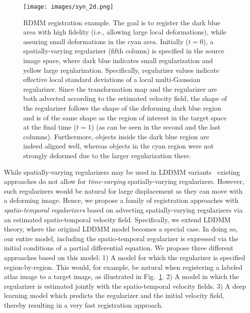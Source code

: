 \documentclass{article}
\numberwithin{equation}{section}
\newcommand{\ie}{{i.e.}}
\begin{document}
\begin{figure}[!ht]
\texttt{[image: images/syn\_2d.png]}
\caption{RDMM registration example. The goal is to register the dark blue area with high fidelity (\ie, allowing large local deformations), while assuring small deformations in the cyan area.  Initially ($t=0$), a spatially-varying regularizer (fifth column) is specified in the source image space, where dark blue indicates small regularization and yellow large regularization. Specifically, regularizer values indicate effective local standard deviations of a local multi-Gaussian regularizer. Since the transformation map and the regularizer are both advected according to the estimated velocity field, the shape of the regularizer follows the shape of the deforming dark blue region and is of the same shape as the region of interest in the target space at the final time ($t=1$) (as can be seen in the second and the last columns). Furthermore, objects inside the dark blue region are indeed aligned well, whereas objects in the cyan region were not strongly deformed due to the larger regularization there.}
\label{fig:syn_2d}
\end{figure}






While spatially-varying regularizers may be used in LDDMM variants~\cite{schmah2013left} existing approaches do not allow for \emph{time-varying} spatially-varying regularizers. However, such regularizers would be natural for large displacement as they can move with a deforming image. Hence, we propose a family of registration approaches with \emph{spatio-temporal regularizers} based on advecting spatially-varying regularizers via an estimated spatio-temporal velocity field. Specifically, we extend LDDMM theory, where the original LDDMM model becomes a special case. In doing so, our entire model, including the spatio-temporal regularizer is expressed via the initial conditions of a partial differential equation. We propose three different approaches based on this model: 1) A model for which the regularizer is specified region-by-region. This would, for example, be natural when registering a labeled atlas image to a target image, as illustrated in Fig.~\ref{fig:syn_2d}.  2) A model in which the regularizer is estimated jointly with the spatio-temporal velocity fields. 3) A deep learning model which predicts the regularizer and the initial velocity field, thereby resulting in a very fast registration approach. 
\end{document}
